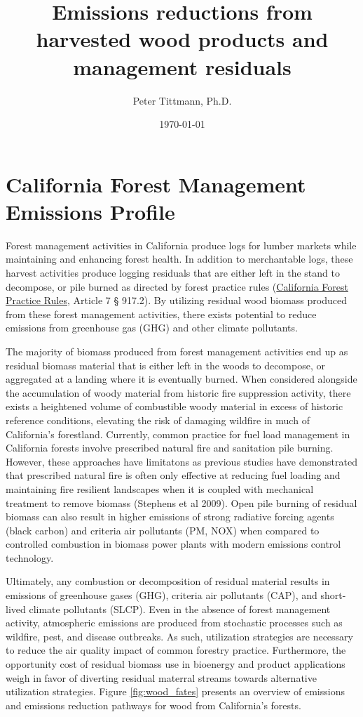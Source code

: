 \documentclass[a4paper]{article}
\author{Peter Tittmann, Ph.D.}
\date{\today}
\title{Emissions reductions from harvested wood products and management residuals}
\begin{document}
\maketitle
\tableofcontents

\pagebreak
\section{California Forest Management Emissions Profile}
\label{sec-1}

Forest management activities in California produce logs for lumber markets while maintaining and enhancing forest health. In addition to merchantable logs, these harvest activities produce logging residuals that are either left in the stand to decompose, or pile burned as directed by forest practice rules (\href{http://calfire.ca.gov/resource_mgt/downloads/2013_FP_Rulebook_with_Tech_RuleNo1.pdf}{California Forest Practice Rules}, Article 7 §
917.2). By utilizing residual wood biomass produced from these forest management activities, there exists potential to reduce emissions from greenhouse gas (GHG) and other climate pollutants.

The majority of biomass produced from forest management activities end up as residual biomass material that is either left in the woods to decompose, or aggregated at a landing where it is eventually burned. When considered alongside the accumulation of woody material from historic fire suppression activity, there exists a heightened volume of combustible woody material in excess of historic reference conditions, elevating the risk of damaging wildfire in much of California’s forestland. Currently, common practice for fuel load management in California forests involve prescribed natural fire and sanitation pile burning. However, these approaches have limitatons as previous studies have demonstrated that prescribed natural fire is often only effective at reducing fuel loading and maintaining fire resilient landscapes when it is coupled with mechanical treatment to remove biomass (Stephens et al 2009). Open pile burning of residual biomass can also result in higher emissions of strong radiative forcing agents (black carbon) and criteria air pollutants (PM, NOX) when compared to controlled combustion in biomass power plants with modern emissions control technology. 

Ultimately, any combustion or decomposition of residual material results in emissions of greenhouse gases (GHG), criteria air pollutants (CAP), and short-lived climate pollutants (SLCP). Even in the absence of forest management activity, atmospheric emissions are produced from 
stochastic processes such as wildfire, pest, and disease outbreaks. As such, utilization strategies are necessary to reduce the air quality impact of common forestry practice. Furthermore, the opportunity cost of residual biomass use in bioenergy and product applications weigh in favor of diverting residual materral streams towards alternative utilization strategies. Figure \ref{fig:wood_fates} presents an overview of emissions and emissions reduction pathways for wood from California's forests. 
\end{document}
